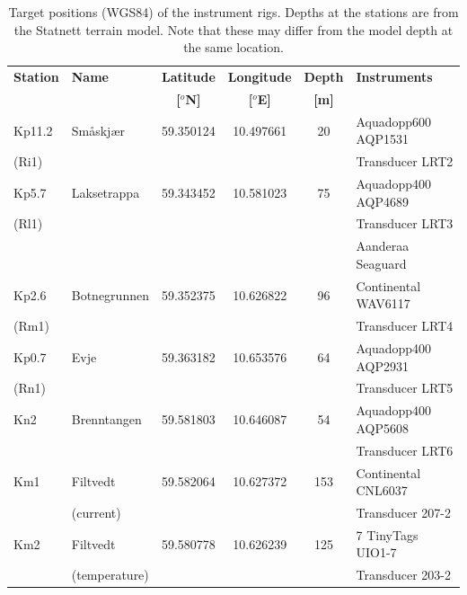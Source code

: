 



\begin{table}[ht] 
\caption{Target positions (WGS84) of the instrument rigs. Depths at the stations are from the Statnett terrain model. Note that these may differ from the model depth at the same location.} 
\label{tab:Statnett} 
\centering 
\begin{tabular}{|llcccl|} 
\hline  
{\bf Station} & {\bf Name} & {\bf Latitude} & {\bf Longitude} & {\bf Depth} & {\bf Instruments} \\ 
&& {\bf [$^o$N]} & {\bf [$^o$E]} & {\bf [m]} & \\ \hline
Kp11.2 & Sm\aa skj\ae r & 59.350124 & 10.497661 & 20 & Aquadopp600 AQP1531 \\
(Ri1) &&&&& Transducer LRT2 \\ \hline
Kp5.7 & Laksetrappa & 59.343452 & 10.581023 & 75 & Aquadopp400 AQP4689 \\
(Rl1) &&&&& Transducer LRT3 \\
      &&&&& Aanderaa Seaguard \\  \hline
Kp2.6 & Botnegrunnen & 59.352375 & 10.626822 & 96 & Continental WAV6117 \\
(Rm1) &&&&& Transducer LRT4 \\ \hline
Kp0.7 & Evje & 59.363182 & 10.653576 & 64 & Aquadopp400 AQP2931 \\
(Rn1) &&&&& Transducer LRT5 \\ \hline
Kn2 & Brenntangen & 59.581803 & 10.646087 & 54 & Aquadopp400 AQP5608 \\
      &&&&& Transducer LRT6 \\ \hline
Km1 & Filtvedt & 59.582064 & 10.627372 & 153 & Continental CNL6037 \\
      & (current) &&&& Transducer 207-2 \\ \hline
Km2 & Filtvedt & 59.580778 & 10.626239 & 125 & 7 TinyTags UIO1-7 \\
      & (temperature) &&&& Transducer 203-2 \\
\hline
\end{tabular}
\end{table}

